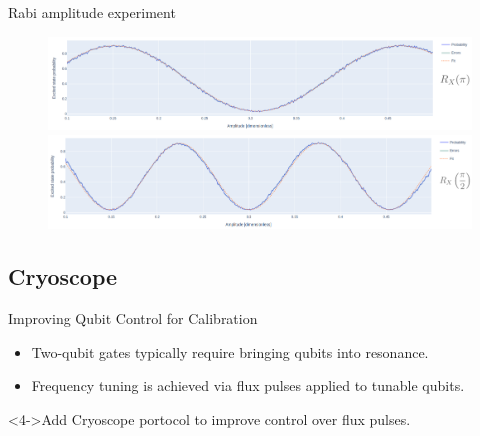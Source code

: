 \documentclass[aspectratio=169,10pt]{beamer}
\begin{document}
\begin{frame}{Rabi amplitude experiment}
    \begin{figure}
    \centering
    \includegraphics[width=\textwidth]{figures/B4.png}
    \vfill
    \includegraphics[width=\textwidth]{figures/B4_90.png}
  \end{figure}
\end{frame}


\subsection{Cryoscope}

\begin{frame}{Improving Qubit Control for Calibration}
  \begin{itemize}
    \item<2-> Two-qubit gates typically require bringing qubits into resonance.
    \item<3-> Frequency tuning is achieved via flux pulses applied to tunable qubits.
  \end{itemize}
  <4->Add Cryoscope portocol to improve control over flux pulses.
\end{frame}
\end{document}
